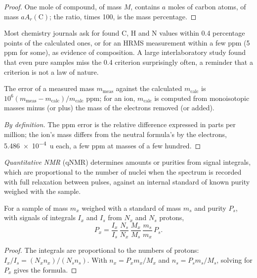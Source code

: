 \begin{proof}
One mole of compound, of mass $M$, contains $a$ moles of carbon atoms, of mass $aA_r(\mathrm C)$;
the ratio, times 100, is the mass percentage.
\end{proof}

Most chemistry journals ask for found C, H and N values within 0.4 percentage
points of the calculated ones, or for an HRMS measurement within a few ppm (5 ppm
for some), as evidence of composition. A large interlaboratory study found that
even pure samples miss the 0.4 criterion surprisingly often, a reminder that a
criterion is not a law of nature.

\begin{proposition}\label{prop:b3:lab-techniques-3:ppm-error}
The error of a measured mass $m_{\mathrm{meas}}$ against the calculated $m_{\mathrm{calc}}$ is
$10^6(m_{\mathrm{meas}} - m_{\mathrm{calc}})/m_{\mathrm{calc}}$ ppm; for an ion, $m_{\mathrm{calc}}$ is computed from monoisotopic masses minus (or plus) the
mass of the electrons removed (or added).
\end{proposition}

\begin{proof}[By definition]
The ppm error is the relative difference expressed in parts per million; the
ion's mass differs from the neutral formula's by the electrons, \qty{5.486e-4}{u} each, a
few ppm at masses of a few hundred.
\end{proof}

\begin{definition}\label{def:b3:lab-techniques-3:qnmr}
\emph{Quantitative NMR} (qNMR) determines amounts or
purities from signal integrals, which are proportional to the number of nuclei
when the spectrum is recorded with full relaxation between pulses, against an
internal standard of known purity weighed with the sample.
\end{definition}

\begin{proposition}\label{prop:b3:lab-techniques-3:qnmr}
For a sample of mass $m_x$ weighed with a standard of mass $m_s$ and purity $P_s$, with signals
of integrals $I_x$ and $I_s$ from $N_x$ and $N_s$ protons,
\[
  P_x = \frac{I_x}{I_s}\,\frac{N_s}{N_x}\,\frac{M_x}{M_s}\,\frac{m_s}{m_x}\,P_s.
\]
\end{proposition}

\begin{proof}
The integrals are proportional to the numbers of protons: $I_x/I_s = (N_xn_x)/(N_sn_s)$. With
$n_x = P_xm_x/M_x$ and $n_s = P_sm_s/M_s$, solving for $P_x$ gives the formula.
\end{proof}


